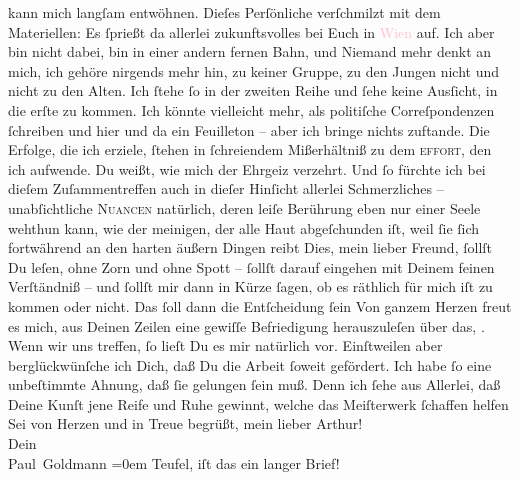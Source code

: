                kann mich langſam  entwöhnen. Dieſes Perſönliche
               verſchmilzt mit dem Materiellen: Es ſprießt da allerlei zukunftsvolles bei Euch in
                  \textcolor{pink}{Wien}{}\ledrightnote{\textcolor{pink}{Wien}} auf. Ich aber bin nicht dabei, bin in einer
               andern fernen Bahn, und Niemand mehr denkt an mich, ich gehöre nirgends mehr hin, zu
               keiner Gruppe, zu den Jungen nicht und nicht zu den Alten. Ich ſtehe ſo {\pb}in der zweiten Reihe und ſehe keine Ausſicht, in die
               erſte zu kommen. Ich könnte vielleicht mehr, als politiſche Correſpondenzen ſchreiben
               und hier und da ein Feuilleton – aber ich bringe nichts zuftande. Die Erfolge, die
               ich erziele, ſtehen in ſchreiendem Mißerhältniß zu dem \textsc{effort}, den ich aufwende. Du weißt, wie mich der Ehrgeiz verzehrt.  Und ſo fürchte ich bei dieſem Zuſammentreffen auch
               in dieſer Hinſicht allerlei Schmerzliches – unabſichtliche \textsc{Nuancen} natürlich,  deren leiſe Berührung
               eben nur einer Seele wehthun  kann, wie der
               meinigen, der alle Haut abgeſchunden iſt, weil ſie ſich fortwährend an den harten {\pb}äußern Dingen reibt{\dotsfive}\pend
           \pstart
           Dies, mein lieber Freund, ſollſt Du leſen, ohne Zorn und ohne Spott – ſollſt darauf
               eingehen mit Deinem feinen Verſtändniß – und ſollſt mir dann in Kürze ſagen, \strikeout{\textcolor{gray}{×}\-\textcolor{gray}{×}\-\textcolor{gray}{×}\-\textcolor{gray}{×}\-\textcolor{gray}{×}} ob
                   es räthlich für mich iſt zu kommen oder nicht.
               Das ſoll dann die Entſcheidung ſein{\dotsfour}\pend
           \pstart
           Von ganzem Herzen freut es mich, aus Deinen Zeilen eine gewiſſe Befriedigung
               herauszuleſen über das, \label{K_L02608-4v}\label{K_L02608-4h}. Wenn
               wir uns treffen, ſo lieſt Du es mir {\pb}natürlich vor.
               Einſtweilen aber berglückwünſche ich Dich, daß Du die Arbeit ſoweit gefördert. Ich
               habe ſo eine unbeſtimmte Ahnung, daß ſie gelungen ſein muß. Denn ich ſehe aus
               Allerlei, daß Deine Kunſt jene Reife und Ruhe gewinnt, welche das Meiſterwerk
               ſchaffen helfen{\dotsfour}\pend
           \pstart
           Sei von Herzen und in Treue begrüßt, mein lieber Arthur!{\\[\baselineskip]} Dein{\\[\baselineskip]}\spacefill\mbox{Paul Goldmann}\pend
           \leftskip=0em{}\pstart
           \noindent{}Teufel, iſt das ein langer Brief!\pend
           \endnumbering{}  
      